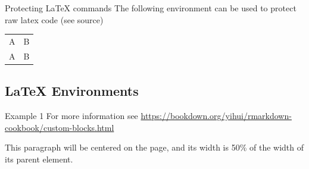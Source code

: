 \documentclass[
  ignorenonframetext,
  aspectratio=169]{beamer}
\begin{document}
\begin{frame}{Protecting LaTeX commands}
The following environment can be used to protect raw latex code (see
source)

\begin{tabular}{ll}
A & B \\
A & B \\
\end{tabular}
\end{frame}

\hypertarget{latex-environments}{%
\subsection{LaTeX Environments}\label{latex-environments}}

\begin{frame}{Example 1}
\protect\hypertarget{example-1}{}
For more information see
\url{https://bookdown.org/yihui/rmarkdown-cookbook/custom-blocks.html}

\begin{center}

\begin{minipage}{.5\linewidth}
This paragraph will be centered on the page, and its width is 50\% of
the width of its parent element.

\end{minipage}

\end{center}
\end{frame}
\end{document}
